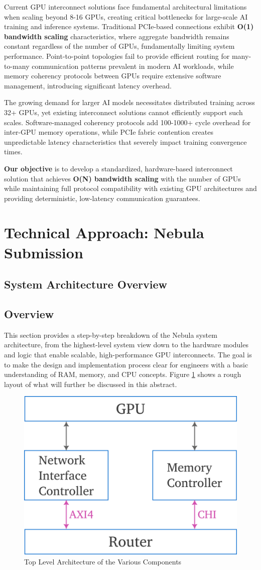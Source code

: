 \documentclass[11pt,a4paper]{article}
\begin{document}
Current GPU interconnect solutions face fundamental architectural limitations when scaling beyond 8-16 GPUs, creating critical bottlenecks for large-scale AI training and inference systems. Traditional PCIe-based connections exhibit \textbf{O(1) bandwidth scaling} characteristics, where aggregate bandwidth remains constant regardless of the number of GPUs, fundamentally limiting system performance. Point-to-point topologies fail to provide efficient routing for many-to-many communication patterns prevalent in modern AI workloads, while memory coherency protocols between GPUs require extensive software management, introducing significant latency overhead.

The growing demand for larger AI models necessitates distributed training across 32+ GPUs, yet existing interconnect solutions cannot efficiently support such scales. Software-managed coherency protocols add 100-1000+ cycle overhead for inter-GPU memory operations, while PCIe fabric contention creates unpredictable latency characteristics that severely impact training convergence times.

\textbf{Our objective} is to develop a standardized, hardware-based interconnect solution that achieves \textbf{O(N) bandwidth scaling} with the number of GPUs while maintaining full protocol compatibility with existing GPU architectures and providing deterministic, low-latency communication guarantees.

\section{Technical Approach: Nebula Submission}

\subsection{System Architecture Overview}

\subsection*{Overview}
This section provides a step-by-step breakdown of the Nebula system architecture, from the highest-level system view down to the hardware modules and logic that enable scalable, high-performance GPU interconnects. The goal is to make the design and implementation process clear for engineers with a basic understanding of RAM, memory, and CPU concepts. Figure \ref{fig:top architecture} shows a rough layout of what will further be discussed in this abstract.
\begin{figure}[h!]
	\centering
	\includegraphics[width=0.35\linewidth]{images/component-architecture.png}
	\caption{Top Level Architecture of the Various Components}
	\label{fig:top architecture}
\end{figure}
\end{document}

